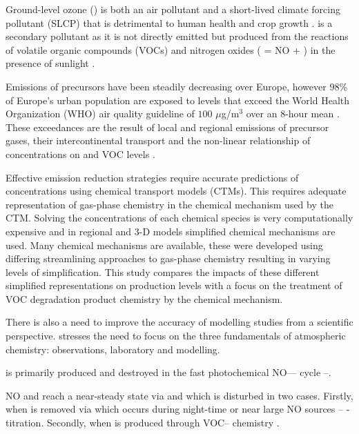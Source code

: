 Ground-level ozone () is both an air pollutant and a short-lived climate forcing pollutant (SLCP) that is detrimental to human health and crop growth \citep{AQEU:2013}. 
 is a secondary pollutant as it is not directly emitted but produced from the reactions of volatile organic compounds (VOCs) and nitrogen oxides ( = NO + ) in the presence of sunlight \citep{Atkinson:2000}.

Emissions of  precursors have been steadily decreasing over Europe, however $98$\% of Europe's urban population are exposed to levels that exceed the World Health Organization (WHO) air quality guideline of $100$ $\mu$g/m$^3$ over an $8$-hour mean \citep{WHO:2006}. 
These exceedances are the result of local and regional emissions of  precursor gases, their intercontinental transport and the non-linear relationship of  concentrations on  and VOC levels \citep{AQEU:2013}.

Effective emission reduction strategies require accurate predictions of  concentrations using chemical transport models (CTMs). 
This requires adequate representation of gas-phase chemistry in the chemical mechanism used by the CTM. 
Solving the concentrations of each chemical species is very computationally expensive and in regional and 3-D models simplified chemical mechanisms are used. 
Many chemical mechanisms are available, these were developed using differing streamlining approaches to gas-phase chemistry resulting in varying levels of simplification. 
This study compares the impacts of these different simplified representations on  production levels with a focus on the treatment of VOC degradation product chemistry by the chemical mechanism.

There is also a need to improve the accuracy of modelling studies from a scientific perspective. 
\citet{Abbatt:2014} stresses the need to focus on the three fundamentals of atmospheric chemistry: observations, laboratory and modelling. 

 is primarily produced and destroyed in the fast photochemical NO---- cycle --. 
\begin{reactionlist}
\end{reactionlist}
NO and  reach a near-steady state via  and  which is disturbed in two cases. 
Firstly, when  is removed via  which occurs during night-time or near large NO sources -- -titration. 
Secondly, when  is produced through VOC-- chemistry \citep{Sillman:1999}.

